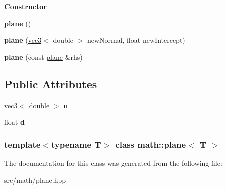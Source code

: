 \begin{Indent}{\bf Constructor}\par
{\em \label{_amgrp678d0a4421b60dc59999ac02837496a6}
 }\begin{DoxyCompactItemize}
\item 
\hypertarget{classmath_1_1plane_abb3a4ec5475d7a160aa3422c97f83573}{
{\bfseries plane} ()}
\label{classmath_1_1plane_abb3a4ec5475d7a160aa3422c97f83573}

\item 
\hypertarget{classmath_1_1plane_ab52bd2dbe10818e2781dc192368e658e}{
{\bfseries plane} (\hyperlink{classmath_1_1vec3}{vec3}$<$ double $>$ newNormal, float newIntercept)}
\label{classmath_1_1plane_ab52bd2dbe10818e2781dc192368e658e}

\item 
\hypertarget{classmath_1_1plane_a06d11b6eafb0002ae6cc077c96163b37}{
{\bfseries plane} (const \hyperlink{classmath_1_1plane}{plane} \&rhs)}
\label{classmath_1_1plane_a06d11b6eafb0002ae6cc077c96163b37}

\end{DoxyCompactItemize}
\end{Indent}
\subsection*{Public Attributes}
\begin{DoxyCompactItemize}
\item 
\hypertarget{classmath_1_1plane_a15a64c66b8d4c5edc9fa3f7669d35724}{
\hyperlink{classmath_1_1vec3}{vec3}$<$ double $>$ {\bfseries n}}
\label{classmath_1_1plane_a15a64c66b8d4c5edc9fa3f7669d35724}

\item 
\hypertarget{classmath_1_1plane_ab1b3df92d98361c35e540887f0be9828}{
float {\bfseries d}}
\label{classmath_1_1plane_ab1b3df92d98361c35e540887f0be9828}

\end{DoxyCompactItemize}
\subsubsection*{template$<$typename T$>$ class math::plane$<$ T $>$}



The documentation for this class was generated from the following file:\begin{DoxyCompactItemize}
\item 
src/math/plane.hpp\end{DoxyCompactItemize}
